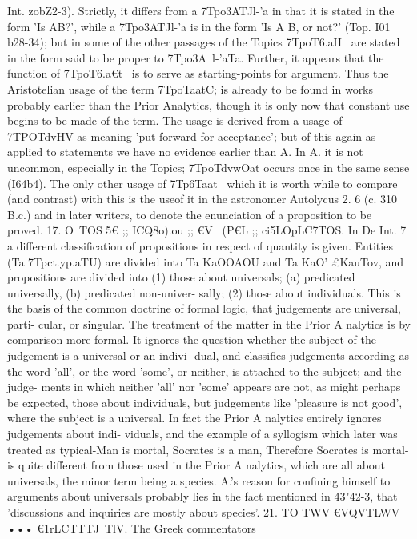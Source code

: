 Int. zobZ2-3). Strictly, it differs from a 7Tpo{3ATJl-'a in that it is
stated in the form 'Is AB?', while a 7Tpo{3ATJl-'a is in the form
'Is A B, or not?' (Top. I01 b28-34); but in some of the other
passages of the Topics 7TpoT6.aH~ are stated in the form said to be
proper to 7Tpo{3A~l-'aTa. Further, it appears that the function of
7TpoT6.a€t~ is to serve as starting-points for argument. Thus the
Aristotelian usage of the term 7TpoTaatC; is already to be found in
works probably earlier than the Prior Analytics, though it is
only now that constant use begins to be made of the term.
The usage is derived from a usage of 7TPOTdvHV as meaning
'put forward for acceptance'; but of this again as applied to
statements we have no evidence earlier than A. In A. it is not
uncommon, especially in the Topics; 7TpoTdvwOat occurs once in
the same sense (I64b4). The only other usage of 7Tp6Taat~ which
it is worth while to compare (and contrast) with this is the useof it in the astronomer Autolycus 2. 6 (c. 310 B.c.) and in later
writers, to denote the enunciation of a proposition to be proved.
17. O~TOS 5€ ;; ICQ8o).ou ;; €V ~(P€L ;; ci5LOpLC7TOS. In De Int. 7 a
different classification of propositions in respect of quantity is
given. Entities (Ta 7Tpct.yp.aTU) are divided into Ta KaOOAOU and
Ta KaO' £KauTov, and propositions are divided into (1) those about
universals; (a) predicated universally, (b) predicated non-univer-
sally; (2) those about individuals. This is the basis of the common
doctrine of formal logic, that judgements are universal, parti-
cular, or singular. The treatment of the matter in the Prior
A nalytics is by comparison more formal. It ignores the question
whether the subject of the judgement is a universal or an indivi-
dual, and classifies judgements according as the word 'all', or the
word 'some', or neither, is attached to the subject; and the judge-
ments in which neither 'all' nor 'some' appears are not, as might
perhaps be expected, those about individuals, but judgements
like 'pleasure is not good', where the subject is a universal. In
fact the Prior A nalytics entirely ignores judgements about indi-
viduals, and the example of a syllogism which later was treated
as typical-Man is mortal, Socrates is a man, Therefore Socrates
is mortal-is quite different from those used in the Prior A nalytics,
which are all about universals, the minor term being a species.
A.'s reason for confining himself to arguments about universals
probably lies in the fact mentioned in 43"42-3, that 'discussions
and inquiries are mostly about species'.
21. TO TWV €VQVTLWV ••• €1rLCTTTJ~TlV. The Greek commentators
}}}
